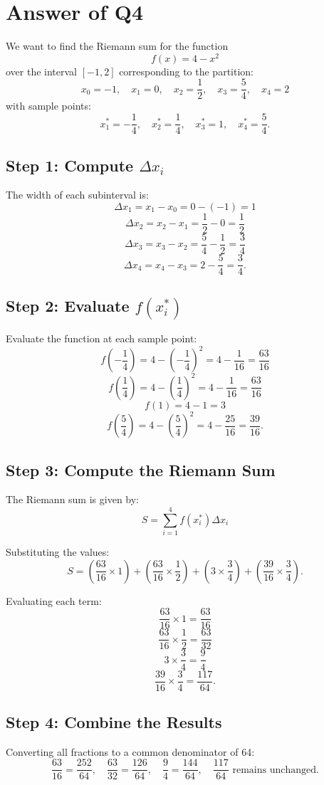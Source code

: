 \documentclass{article}
\begin{document}
\section*{Answer of Q4}
We want to find the Riemann sum for the function 
\[
f(x) = 4 - x^2
\]
over the interval \([-1,2]\) corresponding to the partition:
\[
x_0 = -1, \quad x_1 = 0, \quad x_2 = \frac{1}{2}, \quad x_3 = \frac{5}{4}, \quad x_4 = 2
\]
with sample points:
\[
x_1^* = -\frac{1}{4}, \quad x_2^* = \frac{1}{4}, \quad x_3^* = 1, \quad x_4^* = \frac{5}{4}.
\]

\subsection*{Step 1: Compute \(\Delta x_i\)}
The width of each subinterval is:
\[
\Delta x_1 = x_1 - x_0 = 0 - (-1) = 1
\]
\[
\Delta x_2 = x_2 - x_1 = \frac{1}{2} - 0 = \frac{1}{2}
\]
\[
\Delta x_3 = x_3 - x_2 = \frac{5}{4} - \frac{1}{2} = \frac{3}{4}
\]
\[
\Delta x_4 = x_4 - x_3 = 2 - \frac{5}{4} = \frac{3}{4}.
\]

\subsection*{Step 2: Evaluate \( f(x_i^*) \)}
Evaluate the function at each sample point:
\[
f\left(-\frac{1}{4}\right) = 4 - \left(-\frac{1}{4}\right)^2 = 4 - \frac{1}{16} = \frac{63}{16}
\]
\[
f\left(\frac{1}{4}\right) = 4 - \left(\frac{1}{4}\right)^2 = 4 - \frac{1}{16} = \frac{63}{16}
\]
\[
f(1) = 4 - 1 = 3
\]
\[
f\left(\frac{5}{4}\right) = 4 - \left(\frac{5}{4}\right)^2 = 4 - \frac{25}{16} = \frac{39}{16}.
\]

\subsection*{Step 3: Compute the Riemann Sum}
The Riemann sum is given by:
\[
S = \sum_{i=1}^{4} f(x_i^*) \Delta x_i
\]

Substituting the values:
\[
S = \left(\frac{63}{16} \times 1\right) + \left(\frac{63}{16} \times \frac{1}{2}\right) + \left(3 \times \frac{3}{4}\right) + \left(\frac{39}{16} \times \frac{3}{4}\right).
\]

Evaluating each term:
\[
\frac{63}{16} \times 1 = \frac{63}{16}
\]
\[
\frac{63}{16} \times \frac{1}{2} = \frac{63}{32}
\]
\[
3 \times \frac{3}{4} = \frac{9}{4}
\]
\[
\frac{39}{16} \times \frac{3}{4} = \frac{117}{64}.
\]

\subsection*{Step 4: Combine the Results}
Converting all fractions to a common denominator of 64:
\[
\frac{63}{16} = \frac{252}{64}, \quad \frac{63}{32} = \frac{126}{64}, \quad \frac{9}{4} = \frac{144}{64}, \quad \frac{117}{64} \text{ remains unchanged.}
\]
\end{document}
